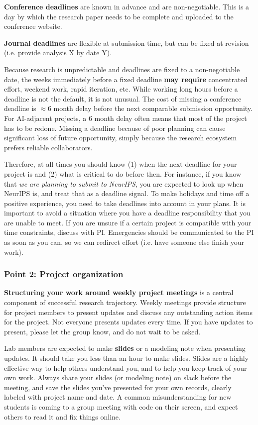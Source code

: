 \documentclass[11pt, letterpaper]{article}
\begin{document}
\textbf{Conference deadlines} are known in advance and are non-negotiable. This is a day by which the research paper needs to be complete and uploaded to the conference website. 

\textbf{Journal deadlines} are flexible at submission time, but can be fixed at revision (i.e. provide analysis X by date Y).

Because research is unpredictable and deadlines are fixed to a non-negotiable date, the weeks immediately before a fixed deadline \textbf{may require} concentrated effort, weekend work, rapid iteration, etc. While working long hours before a deadline is not the default, it is not unusual. The cost of missing a conference deadline is $\approx6$ month delay before the next comparable submission opportunity. For AI-adjacent projects, a 6 month delay often means that most of the project has to be redone. Missing a deadline because of poor planning can cause significant loss of future opportunity, simply because the research ecosystem prefers reliable collaborators. 

Therefore, at all times you should know (1) when the next deadline for your project is and (2) what is critical to do before then. For instance, if you know that \textit{we are planning to submit to NeurIPS}, you are expected to look up when NeurIPS is, and treat that as a deadline signal. 
To make holidays and time off a positive experience, you need to take deadlines into account in your plans. It is important to avoid a situation where you have a deadline responsibility that you are unable to meet. If you are unsure if a certain project is compatible with your time constraints, discuss with PI. Emergencies should be communicated to the PI as soon as you can, so we can redirect effort (i.e. have someone else finish your work). 
 
\subsubsection*{Point 2: Project organization}

\textbf{Structuring your work around weekly project meetings} is a central component of successful research trajectory. Weekly meetings provide structure for project members to present updates and discuss any outstanding action items for the project. Not everyone presents updates every time. If you have updates to present, please let the group know, and do not wait to be asked. 

Lab members are expected to make \textbf{slides} or a modeling note when presenting updates. It should take you less than an hour to make slides. Slides are a highly effective way to help others understand you, and to help you keep track of your own work. Always share your slides (or modeling note) on slack before the meeting, and save the slides you've presented for your own records, clearly labeled with project name and date. A common misunderstanding for new students is coming to a group meeting with code on their screen, and expect others to read it and fix things online.
\end{document}
